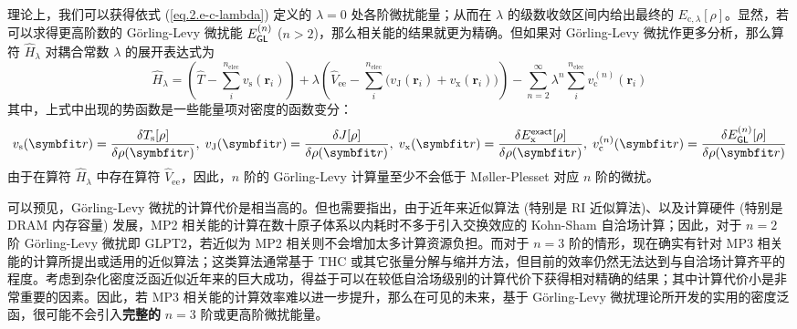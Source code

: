 理论上，我们可以获得依式 (\ref{eq.2.e-c-lambda}) 定义的 $\lambda=0$ 处各阶微扰能量；从而在 $\lambda$ 的级数收敛区间内给出最终的 $E_{\mathrm{c}, \lambda} [\rho]$。显然，若可以求得更高阶数的 G\"orling-Levy 微扰能 $E_{\textsf{GL}}^{(n)}$ ($n > 2$)，那么相关能的结果就更为精确。但如果对 G\"orling-Levy 微扰作更多分析，那么算符 $\hat H_\lambda$ 对耦合常数 $\lambda$ 的展开表达式为
\begin{equation}
  \hat H_\lambda = \left( \hat T - \sum_i^{n_\mathrm{elec}} v_\mathrm{s} (\bm{r}_i) \right) + \lambda \left( \hat V_\mathrm{ee} - \sum_i^{n_\mathrm{elec}} \big( v_\mathrm{J} (\bm{r}_i) + v_\mathrm{x} (\bm{r}_i) \big) \right) - \sum_{n=2}^\infty \lambda^n \sum_{i}^{n_\mathrm{elec}} v_\mathrm{c}^{(n)} (\bm{r}_i)
\end{equation}
其中，上式中出现的势函数是一些能量项对密度的函数变分：
\begin{equation*}
  v_\mathrm{s} (\bm{r}) = \frac{\delta T_\mathrm{s} [\rho]}{\delta \rho(\bm{r})} , \;
  v_\mathrm{J} (\bm{r}) = \frac{\delta J [\rho]}{\delta \rho(\bm{r})}, \;
  v_\mathrm{x} (\bm{r}) = \frac{\delta E_\mathrm{x}^\textmt{exact} [\rho]}{\delta \rho(\bm{r})}, \;
  v_\mathrm{c}^{(n)} (\bm{r}) = \frac{\delta E_\textmt{GL}^{(n)} [\rho]}{\delta \rho (\bm{r})}
\end{equation*}
由于在算符 $\hat H_\lambda$ 中存在算符 $\hat V_\mathrm{ee}$，因此，$n$ 阶的 G\"orling-Levy 计算量至少不会低于 M\o{}ller-Plesset 对应 $n$ 阶的微扰。

可以预见，G\"orling-Levy 微扰的计算代价是相当高的。但也需要指出，由于近年来近似算法 (特别是 RI 近似算法)、以及计算硬件 (特别是 DRAM 内存容量) 发展，MP2 相关能的计算在数十原子体系以内耗时不多于引入交换效应的 Kohn-Sham 自洽场计算；因此，对于 $n = 2$ 阶 G\"orling-Levy 微扰即 GLPT2，若近似为 MP2 相关则不会增加太多计算资源负担。而对于 $n = 3$ 阶的情形，现在确实有针对 MP3 相关能的计算所提出或适用的近似算法；这类算法通常基于 THC 或其它张量分解与缩并方法\cite{Hohenstein-Martinez.JCP.2012, Parrish-Sherrill.JCP.2012, Lee-Head-Gordon.JCTC.2020, Matthews-Matthews.JCTC.2020}，但目前的效率仍然无法达到与自洽场计算齐平的程度\cite{Matthews-Matthews.JCP.2021}。考虑到杂化密度泛函近似近年来的巨大成功，得益于可以在较低自洽场级别的计算代价下获得相对精确的结果；其中计算代价小是非常重要的因素。因此，若 MP3 相关能的计算效率难以进一步提升，那么在可见的未来，基于 G\"orling-Levy 微扰理论所开发的实用的密度泛函，很可能不会引入\textbf{完整的} $n = 3$ 阶或更高阶微扰能量。

